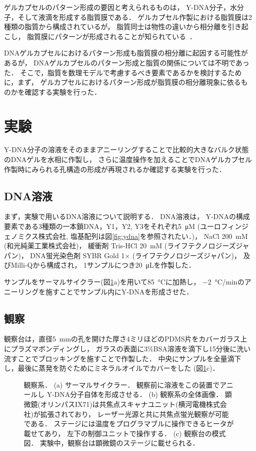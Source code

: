 ゲルカプセルのパターン形成の要因と考えられるものは，
Y-DNA分子，水分子，そして液滴を形成する脂質膜である．
ゲルカプセル作製における脂質膜は2種類の脂質から構成されているが\cite{morita2017formation}，
脂質同士は物性の違いから相分離を引き起こし，
脂質膜にパターンが形成されることが知られている~\cite{yanagisawa2014multiple}．

DNAゲルカプセルにおけるパターン形成も脂質膜の相分離に起因する可能性があるが，
DNAゲルカプセルのパターン形成と脂質の関係については不明であった．
そこで，脂質を数理モデルで考慮するべき要素であるかを検討するために，まず，
ゲルカプセルにおけるパターン形成が脂質膜の相分離現象に依るものかを確認する実験を行った．


\section{実験}
Y-DNA分子の溶液をそのままアニーリングすることで比較的大きなバルク状態のDNAゲルを水相に作製し，
さらに温度操作を加えることでDNAゲルカプセル作製時にみられる孔構造の形成が再現されるか確認する実験を行った．


\subsection{DNA溶液}
まず，実験で用いるDNA溶液について説明する．
DNA溶液は，
Y-DNAの構成要素である3種類の一本鎖DNA，Y1，Y2, Y3をそれぞれ\SI{5}{\micro M} (ユーロフィンジェノミクス株式会社, 塩基配列は図\ref{fig:ydna}を参照されたい．)，
NaCl \SI{200}{mM} (和光純薬工業株式会社)，
緩衝剤 Tris-HCl \SI{20}{mM} (ライフテクノロジーズジャパン)，
DNA蛍光染色剤 SYBR Gold 1× (ライフテクノロジーズジャパン)，
及びMilli-Qから構成され，
1サンプルにつき\SI{20}{\micro L}を作製した．

サンプルをサーマルサイクラー(図\ref{fig:equipments}a)を用いて\SI{85}{\celsius}に加熱し，
\SI{-2}{\celsius/min}のアニーリングを施すことでサンプル内にY-DNAを形成させた．


\subsection{観察}
観察台は，直径\SI{5}{mm}の孔を開けた厚さ4ミリほどのPDMS片をカバーガラス上にプラズマボンディングし，
ガラスの表面に3\%BSA溶液を滴下し15分後に洗い流すことでブロッキングを施すことで作製した．
中央にサンプルを全量滴下し，最後に蒸発を防ぐためにミネラルオイルでカバーをした
(図\ref{fig:equipments}c)．
\begin{figure}
    \centering
    
    \caption{
        観察系．
        (a) サーマルサイクラー．
            観察前に溶液をこの装置でアニールし
            Y-DNA分子自体を形成させる．
        (b) 観察系の全体画像．
            顕微鏡(オリンパスIX71)は共焦点スキャナユニット(横河電機株式会社)が拡張されており，
            レーザー光源と共に共焦点蛍光観察が可能である．
            ステージには温度をプログラマブルに操作できるヒータが載せてあり，
            左下の制御ユニットで操作する．
        (c) 観察台の模式図．
            実験中，観察台は顕微鏡のステージに載せられる．
    }
    \label{fig:equipments}
\end{figure}

